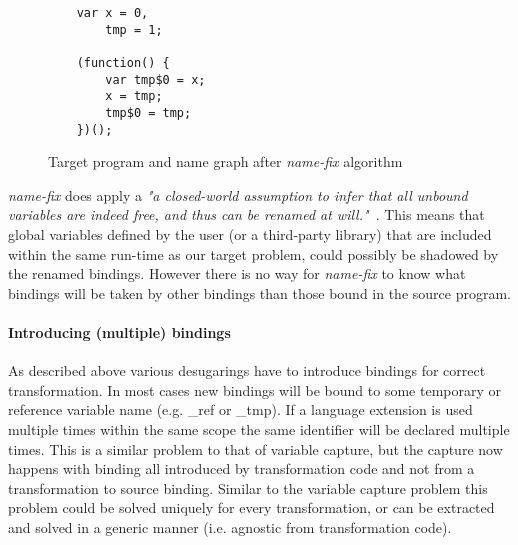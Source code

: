 \begin{figure}[h]
\centering
\begin{minipage}{0.25\linewidth}
\begin{lstlisting}
	var x = 0, 
		tmp = 1;
		
	(function() {
		var tmp$0 = x;
		x = tmp;
		tmp$0 = tmp;
	})();
\end{lstlisting}
\end{minipage}
\hfill
\begin{minipage}{0.65\linewidth}
\end{minipage}

\caption{Target program and name graph after \textit{name-fix} algorithm} \label{fig:name-graph-fixed}
\end{figure}

\textit{name-fix} does apply a \textit{"a closed-world assumption to infer that all unbound variables are indeed free, and thus can be renamed at will."}~\cite{Erdweg2014}. This means that global variables defined by the user (or a third-party library) that are included within the same run-time as our target problem, could possibly be shadowed by the renamed bindings. However there is no way for \textit{name-fix} to know what bindings will be taken by other bindings than those bound in the source program.

\paragraph{Introducing (multiple) bindings}
As described above various desugarings have to introduce bindings for correct transformation. In most cases new bindings will be bound to some temporary or reference variable name (e.g. \_ref or \_tmp). If a language extension is used multiple times within the same scope the same identifier will be declared multiple times. This is a similar problem to that of variable capture, but the capture now happens with binding all introduced by transformation code and not from a transformation to source binding. Similar to the variable capture problem this problem could be solved uniquely for every transformation, or can be extracted and solved in a generic manner (i.e. agnostic from transformation code). 

